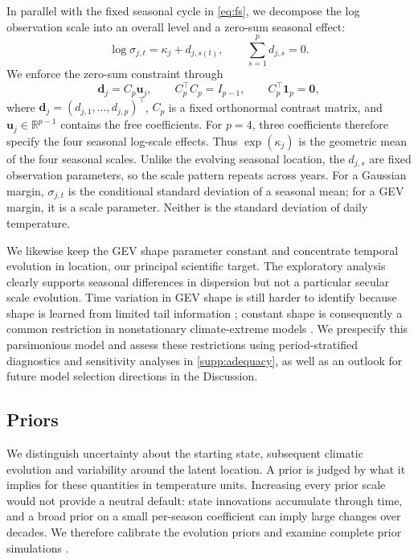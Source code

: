 \documentclass[11pt,a4paper]{article}
\begin{document}
	In parallel with the fixed seasonal cycle in \cref{eq:fs}, we decompose the
	log observation scale into an overall level and a zero-sum seasonal effect:
	\begin{equation}\label{eq:scale}
		\log\sigma_{j,t}
		=\kappa_j+d_{j,s(t)},
		\qquad
		\sum_{s=1}^{p}d_{j,s}=0.
	\end{equation}
	We enforce the zero-sum constraint through
	\begin{equation}\label{eq:seasonal-scale-coordinates}
		\bm d_j=C_p\bm u_j,
		\qquad C_p^\top C_p=I_{p-1},
		\qquad C_p^\top\bm1_p=\bm0,
	\end{equation}
	where \(\bm d_j=(d_{j,1},\ldots,d_{j,p})^\top\), \(C_p\) is a
	fixed orthonormal contrast matrix, and \(\bm u_j\in\mathbb R^{p-1}\)
	contains the free coefficients. For \(p=4\), three coefficients therefore
	specify the four seasonal log-scale effects.
	Thus \(\exp(\kappa_j)\) is the geometric mean of the four seasonal scales.
	Unlike the evolving seasonal location, the \(d_{j,s}\) are fixed observation
	parameters, so the scale pattern repeats across years. For a Gaussian
	margin, \(\sigma_{j,t}\) is the conditional standard deviation of a seasonal
	mean; for a GEV margin, it is a scale parameter. Neither is the standard
	deviation of daily temperature.
	
	We likewise keep the GEV shape parameter constant and concentrate temporal
	evolution in location, our principal scientific target. The exploratory
	analysis clearly supports seasonal differences in dispersion but not a
	particular secular scale evolution. Time variation in GEV shape is still
	harder to identify because shape is learned from limited tail information
	\citep[Chap.~6]{coles2001}; constant shape is consequently a common
	restriction in nonstationary climate-extreme models \citep{kharin2005}. We
	prespecify this parsimonious model and assess these restrictions using
	period-stratified diagnostics and sensitivity analyses in
	\cref{supp:adequacy}, as well as an outlook for future model selection directions in the Discussion.
	
\subsection{Priors}\label{subsec::priors}

We distinguish uncertainty about the starting state, subsequent climatic
evolution and variability around the latent location. A prior is judged by
what it implies for these quantities in temperature units. Increasing every
prior scale would not provide a neutral default: state innovations
accumulate through time, and a broad prior on a small per-season coefficient
can imply large changes over decades. We therefore calibrate the evolution
priors and examine complete prior simulations
\citep{gelman2017prior,gabry2019}.
\end{document}
